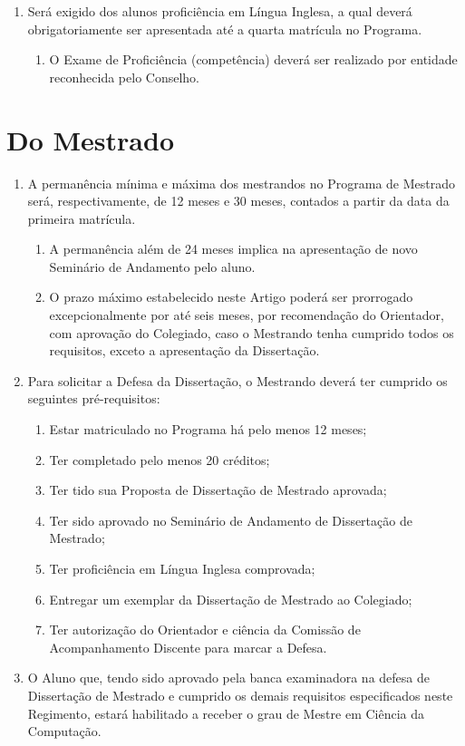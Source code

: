 \documentclass{article}
\newcommand{\singleitem}{\item[Parágrafo Único.]}
\newcommand{\grupoMenor}{Colegiado\xspace}
\newcommand{\grupoMaior}{Conselho\xspace}
\begin{document}
\begin{enumerate}
	\item Será exigido dos alunos proficiência em Língua Inglesa, a qual deverá obrigatoriamente ser apresentada até a quarta matrícula no Programa.
	\begin{enumerate}
		\singleitem O Exame de Proficiência (competência) deverá ser realizado por entidade reconhecida pelo \grupoMaior.
	\end{enumerate}

\end{enumerate}

\section{Do Mestrado}
\begin{enumerate}
	\item A permanência mínima e máxima dos mestrandos no Programa de Mestrado será, respectivamente, de 12 meses e 30 meses, contados a partir da data da primeira matrícula.
	\begin{enumerate}
		\item A permanência além de 24 meses implica na apresentação de novo Seminário de Andamento pelo aluno.	
		\item O prazo máximo estabelecido neste Artigo poderá ser prorrogado excepcionalmente por até seis meses, por recomendação do Orientador, com aprovação do \grupoMenor, caso o Mestrando tenha cumprido todos os requisitos, exceto a apresentação da Dissertação.
	\end{enumerate}

	\item Para solicitar a Defesa da Dissertação, o Mestrando deverá ter cumprido os seguintes pré-requisitos:
	\begin{enumerate}[label=\Roman*]
		\item 	Estar matriculado no Programa há pelo menos 12 meses;
		\item 	Ter completado pelo menos 20 créditos;
		\item 	Ter tido sua Proposta de Dissertação de Mestrado aprovada;
		\item 	Ter sido aprovado no Seminário de Andamento de Dissertação de Mestrado;
		\item 	Ter proficiência em Língua Inglesa comprovada;
		\item 	Entregar um exemplar da Dissertação de Mestrado ao \grupoMenor;
		\item 	Ter autorização do Orientador e ciência da Comissão de Acompanhamento Discente para marcar a Defesa.
	\end{enumerate}

	\item O Aluno que, tendo sido aprovado pela banca examinadora na defesa de Dissertação de Mestrado e cumprido os demais requisitos especificados neste Regimento, estará habilitado a receber o grau de Mestre em Ciência da Computação.

\end{enumerate}
\end{document}
